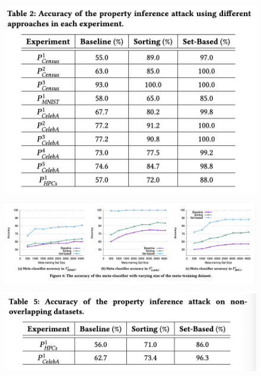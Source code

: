 \documentclass[11pt]{article}
\numberwithin{equation}{section}
\begin{document}
\begin{figure}[H]
	\centering
	\includegraphics[width=12cm]{figures/Accuracy_diff_approches.png}
	\label{fig:property inference model}
\end{figure}

\begin{figure}[H]
	\centering
	\includegraphics[width=15cm]{figures/efficiency.png}
	\label{fig:property inference model}
\end{figure}

\begin{figure}[H]
	\centering
	\includegraphics[width=15cm]{figures/non_overlapping datasets.png}
	\label{fig:property inference model}
\end{figure}
\end{document}

